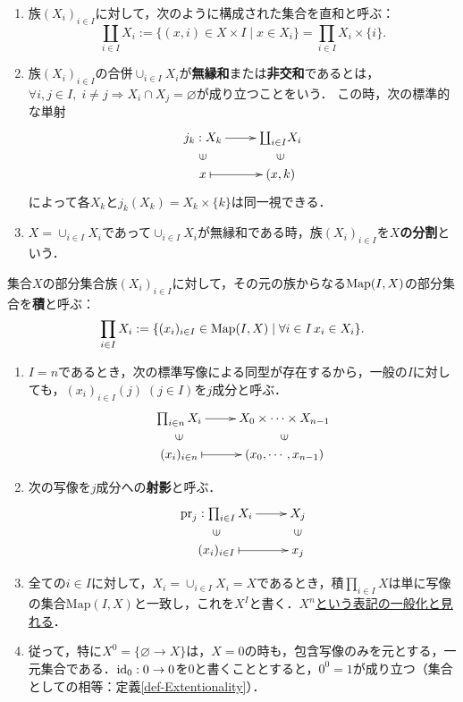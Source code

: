 \documentclass[uplatex,dvipdfmx]{jsreport}
\begin{document}
\begin{definition}[無縁和と直和]\mbox{}
    \begin{enumerate}
        \item 族$(X_i)_{i\in I}$に対して，次のように構成された集合を直和と呼ぶ：
    \[\coprod_{i\in I}X_i := \{ (x,i)\in X\times I\mid x\in X_i \}=\prod_{i\in I}X_i\times\{i\}.\]
    \item 族$(X_i)_{i\in I}$の合併$\cup_{i\in I}X_i$が\textbf{無縁和}または\textbf{非交和}であるとは，$\forall i,j\in I,\; i\ne j\Rightarrow X_i\cap X_j=\varnothing$が成り立つことをいう．
    この時，次の標準的な単射
    \[\xymatrix@R-2pc{
        j_k:X_k\ar[r]&\coprod_{i\in I}X_i\\
        \rotatebox[origin=c]{90}{$\in$}&\rotatebox[origin=c]{90}{$\in$}\\
        x\ar@{|->}[r]&(x,k)
    }\]
    によって各$X_k$と$j_k(X_k)=X_k\times \{k\}$は同一視できる．
    \item $X=\cup_{i\in I}X_i$であって$\cup_{i\in I}X_i$が無縁和である時，族$(X_i)_{i\in I}$を\textbf{$X$の分割}という．
    \end{enumerate}
\end{definition}
\begin{definition}[積]
    集合$X$の部分集合族$(X_i)_{i\in I}$に対して，その元の族からなる$\mathrm{Map}(I,X)$の部分集合を\textbf{積}と呼ぶ：
    \[\prod_{i\in I}X_i := \{ (x_i)_{i\in I}\in \mathrm{Map}(I,X)\mid\forall i\in I \, x_i\in X_i \}.\]
    \begin{enumerate}
        \item $I=n$であるとき，次の標準写像による同型が存在するから，一般の$I$に対しても，$(x_i)_{i\in I}(j)\;(j\in I)$を$j$成分と呼ぶ．
    \[\xymatrix@R-2pc{
        \prod_{i\in n}X_i\ar[r]&X_0\times \cdots\times X_{n-1}\\
        \rotatebox[origin=c]{90}{$\in$}&\rotatebox[origin=c]{90}{$\in$}\\
        (x_i)_{i\in n}\ar@{|->}[r] & (x_0,\cdots,x_{n-1})
    }\]
    \item 次の写像を$j$成分への\textbf{射影}と呼ぶ．
    \[\xymatrix@R-2pc{
        \pr_j:\prod_{i\in I}X_i\ar[r]&X_j\\
        \rotatebox[origin=c]{90}{$\in$}&\rotatebox[origin=c]{90}{$\in$}\\
        (x_i)_{i\in I} \ar@{|->}[r] & x_j
    }\]
    \item 全ての$i\in I$に対して，$X_i=\cup_{i\in I}X_i=X$であるとき，積$\prod_{i\in I}X$は単に写像の集合$\mathrm{Map}(I,X)$と一致し，これを$X^I$と書く．\underline{$X^n$という表記の一般化と見れる}．
    \item 従って，特に$X^0=\{\varnothing\to X\}$は，$X=0$の時も，包含写像のみを元とする，一元集合である．$\mathrm{id}_0:0\to 0$を$0$と書くこととすると，$0^0=1$が成り立つ（集合としての相等：定義\ref{def-Extentionality}）．
    \end{enumerate}
\end{definition}
\end{document}

